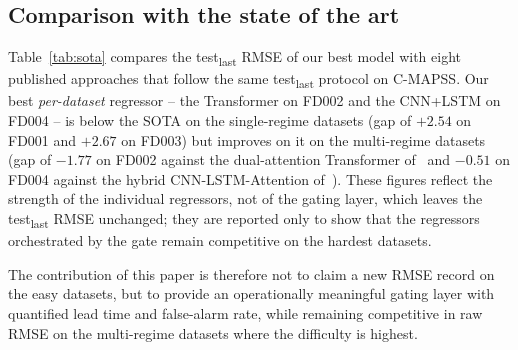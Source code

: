 \documentclass[5p,times,authoryear]{elsarticle}
\begin{document}
\subsection{Comparison with the state of the art}\label{sec:results-sota}

Table~\ref{tab:sota} compares the test\textsubscript{last} RMSE of our best model with eight published approaches that follow the same test\textsubscript{last} protocol on C-MAPSS. Our best \emph{per-dataset} regressor -- the Transformer on FD002 and the CNN+LSTM on FD004 -- is below the SOTA on the single-regime datasets (gap of $+2.54$ on FD001 and $+2.67$ on FD003) but improves on it on the multi-regime datasets (gap of $-1.77$ on FD002 against the dual-attention Transformer of~\citet{liu2023dual} and $-0.51$ on FD004 against the hybrid CNN-LSTM-Attention of~\citet{wang2024hybrid}). These figures reflect the strength of the individual regressors, not of the gating layer, which leaves the test\textsubscript{last} RMSE unchanged; they are reported only to show that the regressors orchestrated by the gate remain competitive on the hardest datasets.

The contribution of this paper is therefore not to claim a new RMSE record on the easy datasets, but to provide an operationally meaningful gating layer with quantified lead time and false-alarm rate, while remaining competitive in raw RMSE on the multi-regime datasets where the difficulty is highest.
\end{document}
